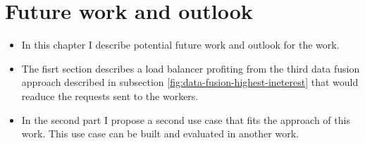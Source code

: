 \chapter{Future work and outlook}
\label{chap:future-work}
\begin{itemize}
    \item In this chapter I describe potential future work and outlook for the work.
    \item The fisrt section describes a load balancer profiting from the third data fusion approach described in subsection \ref{fig:data-fusion-highest-ineterest} that would readuce the requests sent to the workers.
    \item In the second part I propose a second use case that fits the approach of this work. This use case can be built and evaluated in another work.
\end{itemize}
